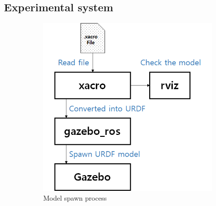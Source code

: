 \documentclass{article}
\begin{document}
		\subsection{Experimental system}
		\begin{figure}[b!]
			\centering
			\begin{subfigure}[b]{0.5\textwidth}
			\centering
			\includegraphics[width=\textwidth]{figures/spawn_model.png}
			\caption{\label{fig:spawn_model}Model spawn process}
			\end{subfigure}%
			~
			\begin{subfigure}[b]{0.5\textwidth}
			\centering

\end{subfigure}
\end{figure}
\end{document}
